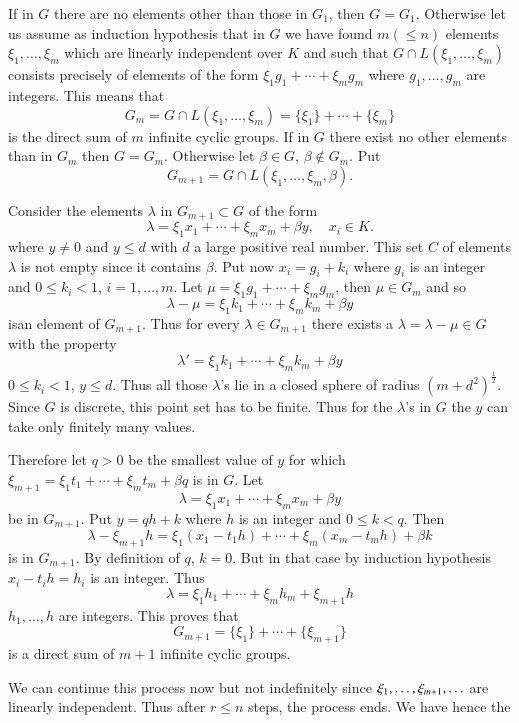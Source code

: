 If in $G$ there are no elements other than those in $G_{1}$, then
$G=G_{1}$. Otherwise let us assume as induction hypothesis that in $G$
we have found $m(\leqslant n)$ elements $\xi_{1},\ldots,\xi_{m}$ which
are linearly independent over $K$ and such that $G\cap
L(\xi_{1},\ldots,\xi_{m})$ consists precisely of elements of the form
$\xi_{1}g_{1}+\cdots+\xi_{m}g_{m}$ where $g_{1},\ldots,g_{m}$ are
integers. This means that
$$
G_{m}=G\cap L(\xi_{1},\ldots,\xi_{m})=\{\xi_{1}\}+\cdots+\{\xi_{m}\}
$$
is the direct sum of $m$ infinite cyclic groups. If in $G$ there exist
no other elements than in $G_{m}$ then $G=G_{m}$. Otherwise let
$\beta\in G$, $\beta\not\in G_{m}$. Put
$$
G_{m+1}=G\cap L(\xi_{1},\ldots,\xi_{m},\beta).
$$

Consider the elements $\lambda$ in $G_{m+1}\subset G$ of the form
$$
\lambda=\xi_{1}x_{1}+\cdots+\xi_{m}x_{m}+\beta y,\quad x_{i}\in K.
$$
where $y\neq 0$ and $y\leqslant d$ with $d$ a large positive real
number. This set $C$ of elements $\lambda$ is not empty since it
contains $\beta$. Put now $x_{i}=g_{i}+k_{i}$ where $g_{i}$ is an
integer and $0\leqslant k_{i}<1$, $i=1,\ldots,m$. Let
$\mu=\xi_{1}g_{1}+\cdots+\xi_{m}g_{m}$, then $\mu\in G_{m}$ and so
$$
\lambda-\mu=\xi_{1}k_{1}+\cdots+\xi_{m}k_{m}+\beta y
$$
is\pageoriginale an element of $G_{m+1}$. Thus for every $\lambda\in
G_{m+1}$ there exists a $\lambda=\lambda-\mu\in G$ with the property
$$
\lambda'=\xi_{1}k_{1}+\cdots+\xi_{m}k_{m}+\beta y
$$
$0\leqslant k_{i}<1$, $y\leqslant d$. Thus all those $\lambda$'s lie
in a closed sphere of radius $(m+d^{2})^{\frac{1}{2}}$. Since $G$ is
discrete, this point set has to be finite. Thus for the $\lambda$'s in
$G$ the $y$ can take only finitely many values.

Therefore let $q>0$ be the smallest value of $y$ for which
$\xi_{m+1}=\xi_{1}t_{1}+\cdots+\xi_{m}t_{m} + \beta q$ is in $G$. Let
$$ 
\lambda=\xi_{1}x_{1}+\cdots+\xi_{m}x_{m}+\beta y
$$
be in $G_{m+1}$. Put $y=qh+k$ where $h$ is an integer and $0\leqslant
k<q$. Then
$$
\lambda-\xi_{m+1}h=\xi_{1}(x_{1}-t_{1}h)+\cdots+\xi_{m}(x_{m}-t_{m}h)+\beta k
$$
is in $G_{m+1}$. By definition of $q$, $k=0$. But in that case by
induction hypothesis $x_{i}-t_{i}h=h_{i}$ is an integer. Thus
$$
\lambda=\xi_{1}h_{1}+\cdots+\xi_{m}h_{m}+\xi_{m+1}h
$$
$h_{1},\ldots,h$ are integers. This proves that
$$
G_{m+1}=\{\xi_{1}\}+\cdots+\{\xi_{m+1}\}
$$
is a direct sum of $m+1$ infinite cyclic groups.

We can continue this process now but not indefinitely since
$\xi_{1},\ldots,\break\xi_{m+1},\ldots$ are linearly independent. Thus after
$r\leqslant n$ steps, the process ends. We have hence the 

